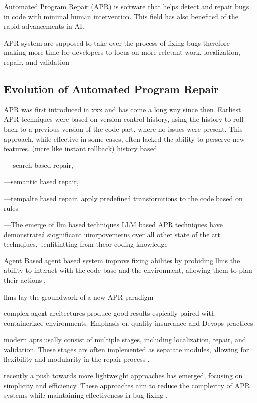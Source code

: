 Automated Program Repair (APR) is software that helps detect and repair bugs in code with minimal human intervention. This field has also benefited of the rapid advancements in AI.

APR system are supposed to take over the process of fixing bugs therefore making more time for developers to focus on more relevant work. 
localization, repair, and validation


\subsection{Evolution of Automated Program Repair}
APR was first introduced in xxx and has come a long way since then.
Earliest APR techniques were based on version control history, using the history to roll back to a previous version of the code part, where no issues were present. This approach, while effective in some cases, often lacked the ability to perserve new features. (more like instant rollback)
history based

--- search based repair,

---semantic based repair,

---tempalte based repair,
apply predefined transformtions to the code based on rules

---The emerge of llm based techniques
LLM based APR techniques have demonstrated siognificant uimrpovemetns over all other state of the art technqiues, benfitintting from theor coding knowledge \cite{hossainDeepDiveLarge2024}

Agent Based
agent based system improve fixing abilites by probiding llms the ability to interact with the code base and the environment, allowing them to plan their actions  \cite{yangSWEagentAgentComputerInterfaces2024}.

llms lay the groundwork of a new APR paradigm \cite{chenUnveilingPitfallsUnderstanding2025}

complex agent arcitectures produce good results espically paired with containerized environments. Emphasis on quality insureance and Devops practices \cite{puvvadiCodingAgentsComprehensive2025}


modern aprs usally consist of multiple stages, including localization, repair, and validation. These stages are often implemented as separate modules, allowing for flexibility and modularity in the repair process \cite{yangSWEagentAgentComputerInterfaces2024}.

recently a push towards more lightweight approaches has emerged, focusing on simplicity and efficiency. These approaches aim to reduce the complexity of APR systems while maintaining effectiveness in bug fixing \cite{xiaAgentlessDemystifyingLLMbased2024}.

